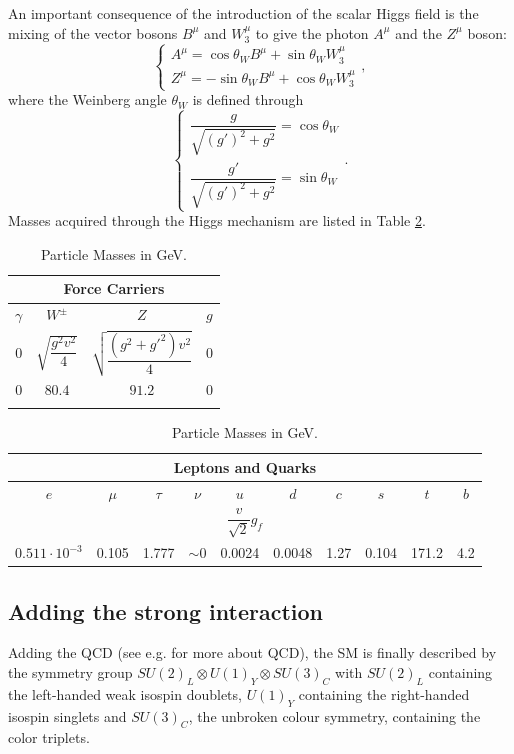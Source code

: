 An important consequence of the introduction of the scalar Higgs field is the mixing of the vector bosons $B^{\mu}$ and $W_{3}^{\mu}$ to give the photon $A^{\mu}$ and the $Z^{\mu}$ boson:\begin{equation}\label{eq:AZ}
\left \{ \begin{array}{ll}
A^{\mu} = \cos\theta_{W}B^{\mu} + \sin\theta_{W}W_{3}^{\mu}\\
Z^{\mu} = -\sin\theta_{W}B^{\mu} + \cos\theta_{W}W_{3}^{\mu}\end{array}\right. ,
\end{equation}where the Weinberg angle $\theta_{W}$ is defined through\begin{equation}\label{eq:weinb}
\left \{ \begin{array}{ll}
\dfrac{g}{\sqrt{(g')^{2}+g^{2}}} = \cos\theta_{W} \\
\dfrac{g'}{\sqrt{(g')^{2}+g^{2}}} = \sin\theta_{W} \end{array}\right. .
\end{equation} Masses acquired through the Higgs mechanism are listed in Table \ref{tab:mass}.
\begin{table}[htb]\centering\begin{tabular}{cccc}
\multicolumn{4}{c}{Force Carriers} \\ \midrule
$\gamma $ &$W^{\pm}$ &$Z$ &$g$ \\
$0$ & $\sqrt{\dfrac{g^{2}v^{2}}{4}} $& $\sqrt{\dfrac{(g^{2}+g'^{2})v^{2}}{4}} $&  $0$ \\
$0$ & $80.4$ & $91.2$ & $0$ \\\hline \hline\\
\end{tabular}

\begin{tabular}{cccccccccc}
\multicolumn{10}{c}{Leptons and Quarks} \\ \midrule
$e$ & $\mu$ &$\tau$ &$\nu$ & $u$ & $d$ & $c$ & $s$ &$ t$ & $b$ \\
\multicolumn{10}{c}{$\dfrac{v}{\sqrt{2}}g_{f}$} \\
$0.511\cdot10^{-3} $ & 0.105 & 1.777 & $\sim0$ & 0.0024 & 0.0048 & 1.27 & 0.104 & 171.2 & 4.2 \\\hline \hline
\end{tabular}\caption{Particle Masses in GeV.}\label{tab:mass} \end{table}


\subsection{Adding the strong interaction}\label{sec:qcdlagr}

Adding the QCD (see e.g. \cite{Ecker} for more about QCD), the SM is finally described by the symmetry group $SU(2)_{L}\otimes U(1)_{Y}\otimes SU(3)_{C}$ with  $SU(2)_{L}$ containing the left-handed weak isospin doublets, $U(1)_{Y}$ containing the right-handed isospin singlets and $SU(3)_{C}$, the unbroken colour symmetry, containing the color triplets.



